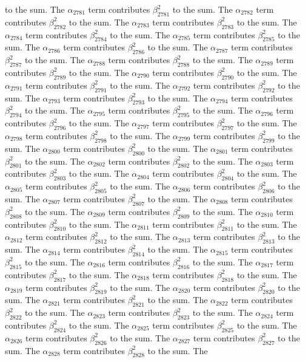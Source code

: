\begin{lemma}
to the sum. The $\alpha_{2781}$ term contributes $\beta_{2781}^{2}$ to the sum. The $\alpha_{2782}$ term contributes $\beta_{2782}^{2}$ to the sum. The $\alpha_{2783}$ term contributes $\beta_{2783}^{2}$ to the sum. The $\alpha_{2784}$ term contributes $\beta_{2784}^{2}$ to the sum. The $\alpha_{2785}$ term contributes $\beta_{2785}^{2}$ to the sum. The $\alpha_{2786}$ term contributes $\beta_{2786}^{2}$ to the sum. The $\alpha_{2787}$ term contributes $\beta_{2787}^{2}$ to the sum. The $\alpha_{2788}$ term contributes $\beta_{2788}^{2}$ to the sum. The $\alpha_{2789}$ term contributes $\beta_{2789}^{2}$ to the sum. The $\alpha_{2790}$ term contributes $\beta_{2790}^{2}$ to the sum. The $\alpha_{2791}$ term contributes $\beta_{2791}^{2}$ to the sum. The $\alpha_{2792}$ term contributes $\beta_{2792}^{2}$ to the sum. The $\alpha_{2793}$ term contributes $\beta_{2793}^{2}$ to the sum. The $\alpha_{2794}$ term contributes $\beta_{2794}^{2}$ to the sum. The $\alpha_{2795}$ term contributes $\beta_{2795}^{2}$ to the sum. The $\alpha_{2796}$ term contributes $\beta_{2796}^{2}$ to the sum. The $\alpha_{2797}$ term contributes $\beta_{2797}^{2}$ to the sum. The $\alpha_{2798}$ term contributes $\beta_{2798}^{2}$ to the sum. The $\alpha_{2799}$ term contributes $\beta_{2799}^{2}$ to the sum. The $\alpha_{2800}$ term contributes $\beta_{2800}^{2}$ to the sum. The $\alpha_{2801}$ term contributes $\beta_{2801}^{2}$ to the sum. The $\alpha_{2802}$ term contributes $\beta_{2802}^{2}$ to the sum. The $\alpha_{2803}$ term contributes $\beta_{2803}^{2}$ to the sum. The $\alpha_{2804}$ term contributes $\beta_{2804}^{2}$ to the sum. The $\alpha_{2805}$ term contributes $\beta_{2805}^{2}$ to the sum. The $\alpha_{2806}$ term contributes $\beta_{2806}^{2}$ to the sum. The $\alpha_{2807}$ term contributes $\beta_{2807}^{2}$ to the sum. The $\alpha_{2808}$ term contributes $\beta_{2808}^{2}$ to the sum. The $\alpha_{2809}$ term contributes $\beta_{2809}^{2}$ to the sum. The $\alpha_{2810}$ term contributes $\beta_{2810}^{2}$ to the sum. The $\alpha_{2811}$ term contributes $\beta_{2811}^{2}$ to the sum. The $\alpha_{2812}$ term contributes $\beta_{2812}^{2}$ to the sum. The $\alpha_{2813}$ term contributes $\beta_{2813}^{2}$ to the sum. The $\alpha_{2814}$ term contributes $\beta_{2814}^{2}$ to the sum. The $\alpha_{2815}$ term contributes $\beta_{2815}^{2}$ to the sum. The $\alpha_{2816}$ term contributes $\beta_{2816}^{2}$ to the sum. The $\alpha_{2817}$ term contributes $\beta_{2817}^{2}$ to the sum. The $\alpha_{2818}$ term contributes $\beta_{2818}^{2}$ to the sum. The $\alpha_{2819}$ term contributes $\beta_{2819}^{2}$ to the sum. The $\alpha_{2820}$ term contributes $\beta_{2820}^{2}$ to the sum. The $\alpha_{2821}$ term contributes $\beta_{2821}^{2}$ to the sum. The $\alpha_{2822}$ term contributes $\beta_{2822}^{2}$ to the sum. The $\alpha_{2823}$ term contributes $\beta_{2823}^{2}$ to the sum. The $\alpha_{2824}$ term contributes $\beta_{2824}^{2}$ to the sum. The $\alpha_{2825}$ term contributes $\beta_{2825}^{2}$ to the sum. The $\alpha_{2826}$ term contributes $\beta_{2826}^{2}$ to the sum. The $\alpha_{2827}$ term contributes $\beta_{2827}^{2}$ to the sum. The $\alpha_{2828}$ term contributes $\beta_{2828}^{2}$ to the sum. The 
\end{lemma}
